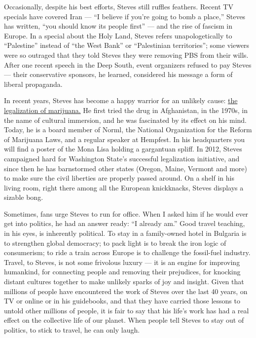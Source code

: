 Occasionally, despite his best efforts, Steves still ruffles feathers.
Recent TV specials have covered Iran --- ``I believe if you're going to
bomb a place,'' Steves has written, ``you should know its people first''
--- and the rise of fascism in Europe. In a special about the Holy Land,
Steves refers unapologetically to ``Palestine'' instead of ``the West
Bank'' or ``Palestinian territories''; some viewers were so outraged
that they told Steves they were removing PBS from their wills. After one
recent speech in the Deep South, event organizers refused to pay Steves
--- their conservative sponsors, he learned, considered his message a
form of liberal propaganda.

In recent years, Steves has become a happy warrior for an unlikely
cause: \href{https://www.youtube.com/watch?v=tvCxGQCeWc4}{the
legalization of marijuana.} He first tried the drug in Afghanistan, in
the 1970s, in the name of cultural immersion, and he was fascinated by
its effect on his mind. Today, he is a board member of Norml, the
National Organization for the Reform of Marijuana Laws, and a regular
speaker at Hempfest. In his headquarters you will find a poster of the
Mona Lisa holding a gargantuan spliff. In 2012, Steves campaigned hard
for Washington State's successful legalization initiative, and since
then he has barnstormed other states (Oregon, Maine, Vermont and more)
to make sure the civil liberties are properly passed around. On a shelf
in his living room, right there among all the European knickknacks,
Steves displays a sizable bong.

Sometimes, fans urge Steves to run for office. When I asked him if he
would ever get into politics, he had an answer ready: ``I already am.''
Good travel teaching, in his eyes, is inherently political. To stay in a
family-owned hotel in Bulgaria is to strengthen global democracy; to
pack light is to break the iron logic of consumerism; to ride a train
across Europe is to challenge the fossil-fuel industry. Travel, to
Steves, is not some frivolous luxury --- it is an engine for improving
humankind, for connecting people and removing their prejudices, for
knocking distant cultures together to make unlikely sparks of joy and
insight. Given that millions of people have encountered the work of
Steves over the last 40 years, on TV or online or in his guidebooks, and
that they have carried those lessons to untold other millions of people,
it is fair to say that his life's work has had a real effect on the
collective life of our planet. When people tell Steves to stay out of
politics, to stick to travel, he can only laugh.

